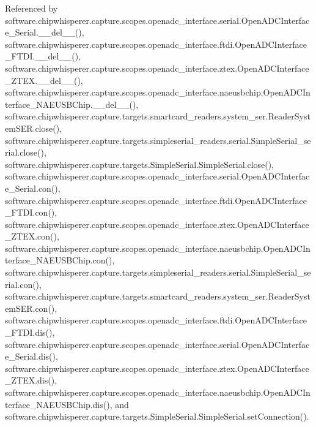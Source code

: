 Referenced by software.\+chipwhisperer.\+capture.\+scopes.\+openadc\+\_\+interface.\+serial.\+Open\+A\+D\+C\+Interface\+\_\+\+Serial.\+\_\+\+\_\+del\+\_\+\+\_\+(), software.\+chipwhisperer.\+capture.\+scopes.\+openadc\+\_\+interface.\+ftdi.\+Open\+A\+D\+C\+Interface\+\_\+\+F\+T\+D\+I.\+\_\+\+\_\+del\+\_\+\+\_\+(), software.\+chipwhisperer.\+capture.\+scopes.\+openadc\+\_\+interface.\+ztex.\+Open\+A\+D\+C\+Interface\+\_\+\+Z\+T\+E\+X.\+\_\+\+\_\+del\+\_\+\+\_\+(), software.\+chipwhisperer.\+capture.\+scopes.\+openadc\+\_\+interface.\+naeusbchip.\+Open\+A\+D\+C\+Interface\+\_\+\+N\+A\+E\+U\+S\+B\+Chip.\+\_\+\+\_\+del\+\_\+\+\_\+(), software.\+chipwhisperer.\+capture.\+targets.\+smartcard\+\_\+readers.\+system\+\_\+ser.\+Reader\+System\+S\+E\+R.\+close(), software.\+chipwhisperer.\+capture.\+targets.\+simpleserial\+\_\+readers.\+serial.\+Simple\+Serial\+\_\+serial.\+close(), software.\+chipwhisperer.\+capture.\+targets.\+Simple\+Serial.\+Simple\+Serial.\+close(), software.\+chipwhisperer.\+capture.\+scopes.\+openadc\+\_\+interface.\+serial.\+Open\+A\+D\+C\+Interface\+\_\+\+Serial.\+con(), software.\+chipwhisperer.\+capture.\+scopes.\+openadc\+\_\+interface.\+ftdi.\+Open\+A\+D\+C\+Interface\+\_\+\+F\+T\+D\+I.\+con(), software.\+chipwhisperer.\+capture.\+scopes.\+openadc\+\_\+interface.\+ztex.\+Open\+A\+D\+C\+Interface\+\_\+\+Z\+T\+E\+X.\+con(), software.\+chipwhisperer.\+capture.\+scopes.\+openadc\+\_\+interface.\+naeusbchip.\+Open\+A\+D\+C\+Interface\+\_\+\+N\+A\+E\+U\+S\+B\+Chip.\+con(), software.\+chipwhisperer.\+capture.\+targets.\+simpleserial\+\_\+readers.\+serial.\+Simple\+Serial\+\_\+serial.\+con(), software.\+chipwhisperer.\+capture.\+targets.\+smartcard\+\_\+readers.\+system\+\_\+ser.\+Reader\+System\+S\+E\+R.\+con(), software.\+chipwhisperer.\+capture.\+scopes.\+openadc\+\_\+interface.\+ftdi.\+Open\+A\+D\+C\+Interface\+\_\+\+F\+T\+D\+I.\+dis(), software.\+chipwhisperer.\+capture.\+scopes.\+openadc\+\_\+interface.\+serial.\+Open\+A\+D\+C\+Interface\+\_\+\+Serial.\+dis(), software.\+chipwhisperer.\+capture.\+scopes.\+openadc\+\_\+interface.\+ztex.\+Open\+A\+D\+C\+Interface\+\_\+\+Z\+T\+E\+X.\+dis(), software.\+chipwhisperer.\+capture.\+scopes.\+openadc\+\_\+interface.\+naeusbchip.\+Open\+A\+D\+C\+Interface\+\_\+\+N\+A\+E\+U\+S\+B\+Chip.\+dis(), and software.\+chipwhisperer.\+capture.\+targets.\+Simple\+Serial.\+Simple\+Serial.\+set\+Connection().

\hypertarget{classsoftware_1_1chipwhisperer_1_1capture_1_1scopes_1_1openadc__interface_1_1ftdi_1_1OpenADCInterface__FTDI_a703c707f97f83493e3583976a2e98626}{}
